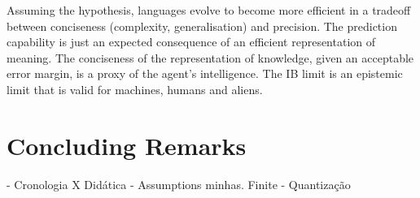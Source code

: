     Assuming the hypothesis, languages evolve to become more efficient in a tradeoff between conciseness (complexity, generalisation) and precision. The prediction capability is just an expected consequence of an efficient representation of meaning. The conciseness of the representation of knowledge, given an acceptable error margin, is a proxy of the agent's intelligence. The IB limit is an epistemic limit that is valid for machines, humans and aliens.

\section{Concluding Remarks}

- Cronologia X Didática
- Assumptions minhas. Finite
- Quantização






